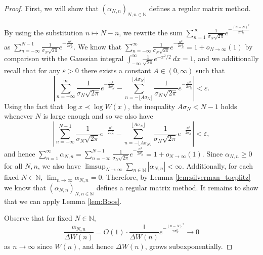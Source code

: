 \documentclass[12pt]{article}
\theoremstyle{plain} %
\theoremstyle{definition} %
\theoremstyle{plain}
\theoremstyle{plain}
\numberwithin{equation}{section}
\newcommand{\N}{\mathbb{N}}
\renewcommand{\epsilon}{\varepsilon}
\renewcommand{\geq}{\geqslant}
\newcommand{\1}{\mathbbm{1}}
\newcommand{\oo}{\infty}
\begin{document}
\begin{proof}
First, we will show that $(\alpha_{N,n})_{N,n\in \N}$ defines a regular matrix method.


By using the substitution $n\mapsto N-n$, we rewrite the sum $ \sum_{n=1}^{\oo}\frac{1}{\sigma_N\sqrt{2\pi}}e^{-\frac{(n-N)^2}{2\sigma_N^2}}$ as $\sum_{n=-\oo}^{N-1}\frac{1}{\sigma_N\sqrt{2\pi}}e^{-\frac{n^2}{2\sigma_N^2}}$. We know that $\sum_{n=-\oo}^{\oo}\frac{1}{\sigma_N\sqrt{2\pi}}e^{-\frac{n^2}{2\sigma_N^2}} = 1+o_{N\to\oo}(1)$ by comparison with the Gaussian integral $\int_{-\oo}^{\oo}\frac{1}{\sqrt{2\pi}}e^{-x^2/2}~dx=1$, and we additionally recall that for any $\epsilon>0$ there exists a constant $A\in (0,\oo)$ such that 
\begin{equation}
    \left|\sum_{n=-\oo}^{\oo}\frac{1}{\sigma_N\sqrt{2\pi}}e^{-\frac{n^2}{2\sigma_N^2}}  - \sum_{n=-\lfloor{A\sigma_N\rfloor}}^{\lfloor  A \sigma_N\rfloor}\frac{1}{\sigma_N\sqrt{2\pi}}e^{-\frac{n^2}{2\sigma_N^2}}\right| <\epsilon. 
\end{equation} 
Using the fact that $\log x\prec \log W(x)$, the inequality $A\sigma_N<N-1$ holds whenever $N$ is large enough and so we also have 
\begin{equation}\label{eq:central_limit_theorem}
     \left|\sum_{n=-\oo}^{N-1}\frac{1}{\sigma_N\sqrt{2\pi}}e^{-\frac{n^2}{2\sigma_N^2}}  - \sum_{n=-\lfloor{A\sigma_N\rfloor}}^{\lfloor  A \sigma_N\rfloor}\frac{1}{\sigma_N\sqrt{2\pi}}e^{-\frac{n^2}{2\sigma_N^2}}\right| <\epsilon,
\end{equation} 
and hence $\sum_{n=1}^{\oo}\alpha_{N,n}=\sum_{n=-\oo}^{N-1}\frac{1}{\sigma_N\sqrt{2\pi}}e^{-\frac{n^2}{2\sigma_N^2}}  = 1+o_{N\to\oo}(1)$. Since $\alpha_{N,n}\geq 0$ for all $N,n$, we also have $\limsup_{N\to\oo}\sum_{n\in \N}|\alpha_{N,n}|<\oo$. Additionally, for each fixed $N\in \N$, $\lim_{n\to\oo}\alpha_{N,n}=0$. Therefore, by Lemma \ref{lem:silverman_toeplitz} we know that $(\alpha_{N,n})_{N,n\in \N}$ defines a regular matrix method. It remains to show that we can apply Lemma \ref{lem:Boos}.

Observe that for fixed $N\in \N$, 
\begin{equation}\label{eq:boos_second_condition}
\frac{\alpha_{N,n}}{\Delta W(n)} = O(1)\cdot \frac{1}{\Delta W(n)}e^{-\frac{(n-N)^2}{2\sigma_N^2}}  \to 0 
\end{equation}
as $n\to\oo$ since $W(n)$, and hence $\Delta W(n)$, grows subexponentially.  


\end{proof}
\end{document}
